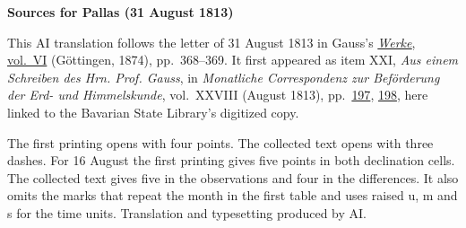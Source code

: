 \clearpage\thispagestyle{empty}
\begin{center}\textbf{Sources for Pallas (31 August 1813)}\end{center}
\noindent This AI translation follows the letter of 31 August 1813 in Gauss’s \href{https://gdz.sub.uni-goettingen.de/id/PPN236007467}{\textit{Werke}, vol.~VI} (Göttingen, 1874), pp.~368--369. It first appeared as item XXI, \textit{Aus einem Schreiben des Hrn. Prof. Gauss}, in \textit{Monatliche Correspondenz zur Beförderung der Erd- und Himmelskunde}, vol.~XXVIII (August 1813), pp.~\href{https://api.digitale-sammlungen.de/iiif/image/v2/bsb10538617_00205/full/1600,/0/default.jpg}{197}, \href{https://api.digitale-sammlungen.de/iiif/image/v2/bsb10538617_00206/full/1600,/0/default.jpg}{198}, here linked to the Bavarian State Library’s digitized copy.
\par\smallskip\noindent The first printing opens with four points. The collected text opens with three dashes. For 16 August the first printing gives five points in both declination cells. The collected text gives five in the observations and four in the differences. It also omits the marks that repeat the month in the first table and uses raised u, m and s for the time units. Translation and typesetting produced by AI.
\clearpage
